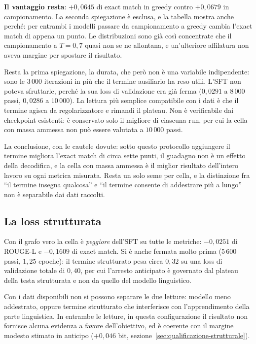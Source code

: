 \textbf{Il vantaggio resta}: $+0{,}0645$ di exact match in greedy contro
$+0{,}0679$ in campionamento. La seconda spiegazione è esclusa, e la tabella
mostra anche perché: per entrambi i modelli passare da campionamento a greedy
cambia l'exact match di appena un punto. Le distribuzioni sono già così
concentrate che il campionamento a $T = 0{,}7$ quasi non se ne allontana, e
un'ulteriore affilatura non aveva margine per spostare il risultato.

Resta la prima spiegazione, la durata, che però non è una variabile
indipendente: sono le $3\,000$ iterazioni in più che il termine ausiliario ha
reso utili. L'SFT non poteva sfruttarle, perché la sua loss di validazione era
già ferma ($0{,}0291$ a $8\,000$ passi, $0{,}0286$ a $10\,000$). La lettura più
semplice compatibile con i dati è che il termine agisca da regolarizzatore e
rimandi il plateau. Non è verificabile dai checkpoint esistenti: è conservato
solo il migliore di ciascuna run, per cui la cella con massa ammessa non può
essere valutata a $10\,000$ passi.

La conclusione, con le cautele dovute: sotto questo protocollo aggiungere il
termine migliora l'exact match di circa sette punti, il guadagno non è un
effetto della decodifica, e la cella con massa ammessa è il miglior risultato
dell'intero lavoro su ogni metrica misurata. Resta un solo seme per cella, e la
distinzione fra ``il termine insegna qualcosa'' e ``il termine consente di
addestrare più a lungo'' non è separabile dai dati raccolti.

\subsection{La loss strutturata}

Con il grafo vero la cella è \emph{peggiore} dell'SFT su tutte le metriche:
$-0{,}0251$ di ROUGE-L e $-0{,}1609$ di exact match. Si è anche fermata molto
prima ($5\,600$ passi, $1{,}25$ epoche): il termine strutturato pesa circa
$0{,}32$ su una loss di validazione totale di $0{,}40$, per cui l'arresto
anticipato è governato dal plateau della testa strutturata e non da quello del
modello linguistico.

Con i dati disponibili non si possono separare le due letture: modello meno
addestrato, oppure termine strutturato che interferisce con l'apprendimento
della parte linguistica. In entrambe le letture, in questa configurazione il
risultato non fornisce alcuna evidenza a favore dell'obiettivo, ed è coerente
con il margine modesto stimato in anticipo ($+0{,}046$ bit,
sezione~\ref{sec:qualificazione-strutturale}).

